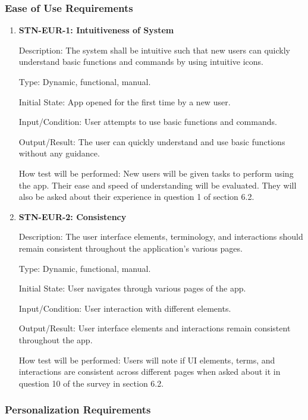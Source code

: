 \documentclass[12pt, titlepage]{article}
\begin{document}
    \subsubsection{Ease of Use Requirements}

    \begin{enumerate}

        \item{\textbf{STN-EUR-1: Intuitiveness of System}}

        Description: The system shall be intuitive such that new users can quickly understand basic functions and commands by using intuitive icons.

        Type: Dynamic, functional, manual.

        Initial State: App opened for the first time by a new user.

        Input/Condition: User attempts to use basic functions and commands.

        Output/Result: The user can quickly understand and use basic functions without any guidance.

        How test will be performed: New users will be given tasks to perform using the app. Their ease and speed of understanding will be evaluated. They will also be asked about their experience in question 1 of section 6.2.


        \item{\textbf{STN-EUR-2: Consistency}}

        Description: The user interface elements, terminology, and interactions should remain consistent throughout the application’s various pages.

        Type: Dynamic, functional, manual.

        Initial State: User navigates through various pages of the app.

        Input/Condition: User interaction with different elements.

        Output/Result: User interface elements and interactions remain consistent throughout the app.

        How test will be performed: Users will note if UI elements, terms, and interactions are consistent across different pages when asked about it in question 10 of the survey in section 6.2.
    \end{enumerate}


    \subsubsection{Personalization Requirements}
\end{document}
